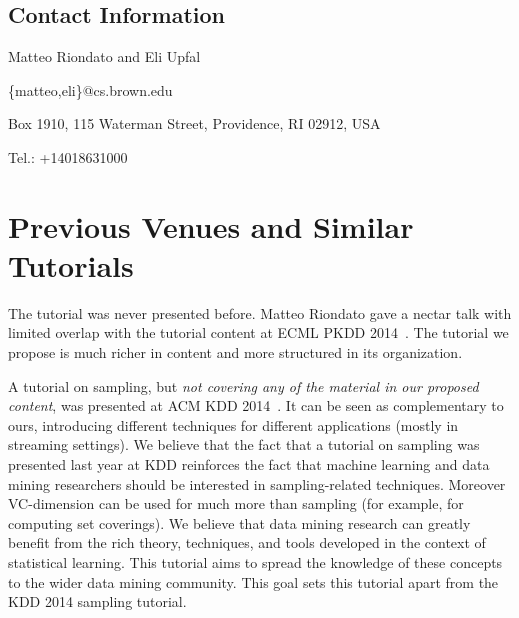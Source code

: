 \documentclass[11pt]{article}
\begin{document}
\subsection*{Contact Information}
Matteo Riondato and Eli Upfal

\textsf{\{matteo,eli\}@cs.brown.edu}

Box 1910, 115 Waterman Street, Providence, RI 02912, USA

Tel.: +14018631000

\section*{Previous Venues and Similar Tutorials}
The tutorial was never presented before. Matteo Riondato gave a nectar
talk with limited overlap with the tutorial content at ECML PKDD
2014~\citep{Riondato14}. The tutorial we propose is much richer in content and
more structured in its organization.

A tutorial on sampling, but \emph{not covering any of the material in our proposed
content}, was presented at ACM KDD 2014~\citep{CormodeD14}. It can be seen as
complementary to ours, introducing different techniques for different
applications (mostly in streaming settings). We believe that the fact that a
tutorial on sampling was presented last year at KDD reinforces the fact that
machine learning and data mining researchers should be interested in
sampling-related techniques. Moreover VC-dimension can be used for much more
than sampling (for example, for computing set coverings). We believe that data
mining research can greatly benefit from the rich theory, techniques, and tools
developed in the context of statistical learning. This tutorial aims to spread
the knowledge of these concepts to the wider data mining community. This goal
sets this tutorial apart from the KDD 2014 sampling tutorial.


%
%
\end{document}
